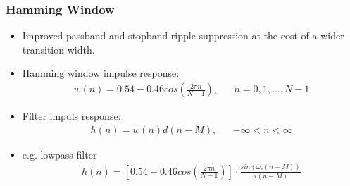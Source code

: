\subsubsection{Hamming Window}
\begin{itemize}
	\item Improved passband and stopband ripple suppression at the cost of a wider transition width.
	\item Hamming window impulse response:
	\begin{align*}
		w(n) = 0.54 -0.46cos\left(\frac{2\pi n}{N-1}\right),&&n= 0,1,\dots,N-1
	\end{align*}
	\item Filter impuls response:
	\begin{align*}
		h(n) = w(n)d(n-M),&&-\infty < n < \infty
	\end{align*}
	\item e.g. lowpass filter
	\begin{align*}
		h(n) = \left[0.54 -0.46cos\left(\frac{2\pi n}{N-1}\right)\right]\cdot\frac{sin(\omega_c(n-M))}{\pi (n-M)}
	\end{align*}
\end{itemize}


